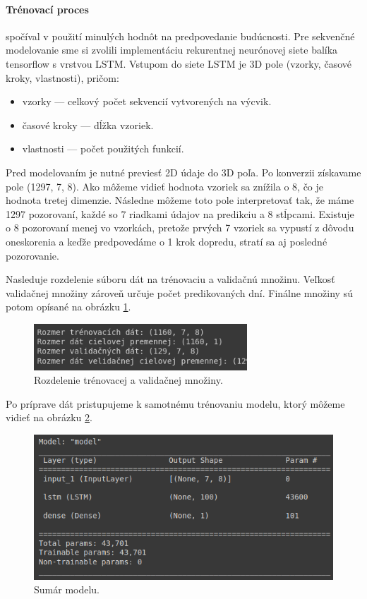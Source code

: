 \paragraph{Trénovací proces} spočíval v použití minulých hodnôt na predpovedanie budúcnosti. Pre sekvenčné modelovanie sme si zvolili implementáciu rekurentnej neurónovej siete balíka tensorflow s vrstvou LSTM. Vstupom do siete LSTM je 3D pole (vzorky, časové kroky, vlastnosti), pričom:
\begin{itemize}
    \item vzorky — celkový počet sekvencií vytvorených na výcvik.
    \item časové kroky — dĺžka vzoriek.
    \item vlastnosti — počet použitých funkcií.
\end{itemize}

Pred modelovaním je nutné previesť 2D údaje do 3D poľa. Po konverzii získavame pole (1297, 7, 8). Ako môžeme vidieť hodnota vzoriek sa znížila o 8, čo je hodnota tretej dimenzie. Následne môžeme toto pole interpretovať tak, že máme 1297 pozorovaní, každé so 7 riadkami údajov na predikciu a 8 stĺpcami. Existuje o 8 pozorovaní menej vo vzorkách, pretože prvých 7 vzoriek sa vypustí z dôvodu oneskorenia a keďže predpovedáme o 1 krok dopredu, stratí sa aj posledné pozorovanie.

Nasleduje rozdelenie súboru dát na trénovaciu a validačnú množinu. Veľkosť validačnej množiny zároveň určuje počet predikovaných dní. Finálne množiny sú potom opísané na obrázku \ref{mnoziny}.
\begin{figure}[!htbp]
  \centering
  \includegraphics[width=8cm]{img/mnoziny.png}
  \caption{Rozdelenie trénovacej a validačnej množiny.}
  \label{mnoziny}
\end{figure}

Po príprave dát pristupujeme k samotnému trénovaniu modelu, ktorý môžeme vidieť na obrázku \ref{model}. 

\begin{figure}[!htbp]
  \centering
  \includegraphics[width=12cm]{img/model.png}
  \caption{Sumár modelu.}
  \label{model}
\end{figure}


